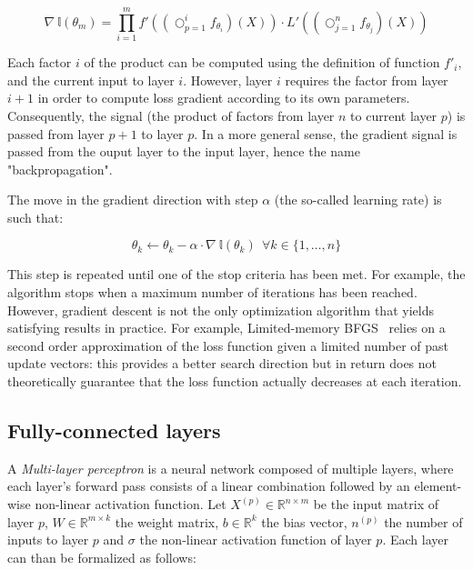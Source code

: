         \begin{equation} \label{eq:loss}
            \nabla \ \mathbb{l}(\theta_m) = \prod_{i=1}^m f'((\bigcirc_{p=1}^{i} f_{\theta_i})(X)) \cdot L'((\bigcirc_{j=1}^{n} f_{\theta_j})(X))
        \end{equation}


        Each factor $i$ of the product can be computed using the definition of function $f'_i$, and the current input to layer $i$.
        However, layer $i$ requires the factor from layer $i+1$ in order to compute loss gradient according to its own parameters.
        Consequently, the signal (the product of factors from layer $n$ to current layer $p$) is passed from layer $p+1$ to layer $p$.
        In a more general sense, the gradient signal is passed from the ouput layer to the input layer, hence the name "backpropagation".

        The move in the gradient direction with step $\alpha$ (the so-called learning rate) is such that:

        \begin{equation}
            \theta_k \leftarrow \theta_k - \alpha \cdot \nabla \ \mathbb{l}(\theta_k) \  \ \forall k \in \{1, \ldots, n\}
        \end{equation}

        This step is repeated until one of the stop criteria has been met. For example, the algorithm stops when a maximum number of iterations has been
        reached. However, gradient descent is not the only optimization algorithm that yields satisfying results in practice.
        For example, Limited-memory BFGS~\cite{LBFGS} relies on a second order approximation of the loss function given a limited number of past
        update vectors: this provides a better search direction but in return does not theoretically guarantee that the loss function actually decreases at each
        iteration.

    \subsection{Fully-connected layers}

        A \textit{Multi-layer perceptron} is a neural network composed of multiple layers,
        where each layer's forward pass consists of a linear combination
        followed by an element-wise non-linear activation function.
        Let $X^{(p)} \in \mathbb{R}^{n \times m}$ be the input matrix of layer $p$,
        $W \in \mathbb{R}^{m \times k}$ the weight matrix,
        $b \in \mathbb{R}^{k}$ the bias vector, $n^{(p)}$ the number of inputs to layer $p$
        and $\sigma$ the non-linear activation function of layer $p$.
        Each layer can than be formalized as follows:

